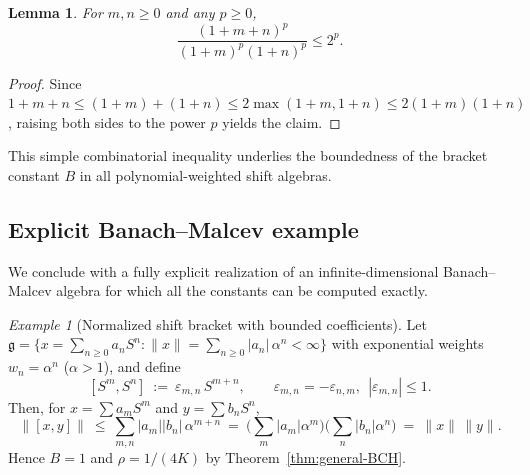 \documentclass[11pt]{amsart}
\numberwithin{equation}{section}
\newtheorem{lemma}[theorem]{Lemma}
\theoremstyle{remark}
\newtheorem{example}[theorem]{Example}
\begin{document}
\begin{lemma}\label{lem:polyappendix}
For $m,n\ge0$ and any $p\ge0$,
\[
\frac{(1+m+n)^p}{(1+m)^p(1+n)^p}\le 2^p.
\]
\end{lemma}

\begin{proof}
Since $1+m+n\le (1+m)+(1+n)\le 2\max(1+m,1+n)\le 2(1+m)(1+n)$,
raising both sides to the power $p$ yields the claim.
\end{proof}

This simple combinatorial inequality underlies the boundedness of the bracket constant $B$ in all polynomial-weighted shift algebras.

\subsection{Explicit Banach--Malcev example}

We conclude with a fully explicit realization of an infinite-dimensional Banach--Malcev algebra for which all the constants can be computed exactly.

\begin{example}[Normalized shift bracket with bounded coefficients]\label{ex:normalized-shift}
Let
$
\mathfrak{g}=\{x=\sum_{n\ge0} a_n S^n: \|x\|=\sum_{n\ge0}|a_n|\,\alpha^n<\infty\}
$
with exponential weights $w_n=\alpha^n$ ($\alpha>1$), and define
\[
[S^m,S^n] \ :=\ \varepsilon_{m,n}\, S^{m+n}, \qquad
\varepsilon_{m,n}=-\varepsilon_{n,m},\ \ |\varepsilon_{m,n}|\le 1.
\]
Then, for $x=\sum a_m S^m$ and $y=\sum b_n S^n$,
\[
\|[x,y]\|\ \le\ \sum_{m,n}|a_m||b_n|\,\alpha^{m+n}
 \ =\ \Big(\sum_m |a_m| \alpha^m\Big)\Big(\sum_n |b_n|\alpha^n\Big)
 \ =\ \|x\|\,\|y\|.
\]
Hence $B=1$ and $\rho=1/(4K)$ by Theorem~\ref{thm:general-BCH}.
\end{example}

\end{document}

